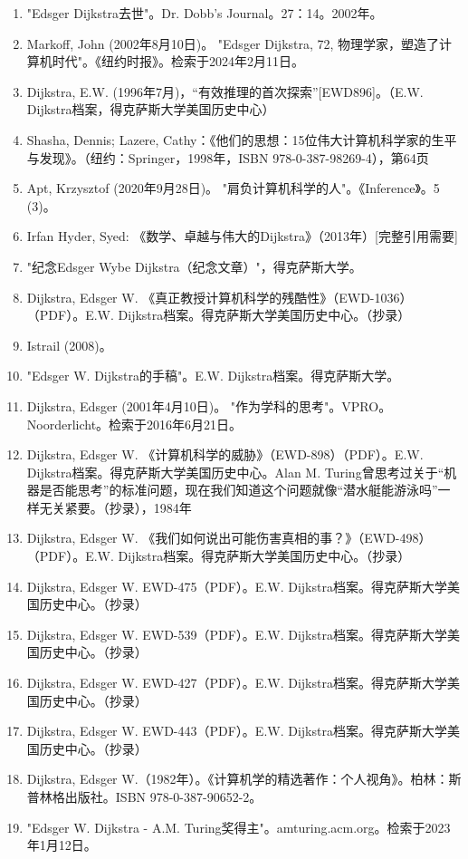 \begin{enumerate}
\item "Edsger Dijkstra去世"。Dr. Dobb's Journal。27：14。2002年。
\item Markoff, John (2002年8月10日)。 "Edsger Dijkstra, 72, 物理学家，塑造了计算机时代"。《纽约时报》。检索于2024年2月11日。
\item Dijkstra, E.W. (1996年7月)，“有效推理的首次探索”[EWD896]。（E.W. Dijkstra档案，得克萨斯大学美国历史中心）
\item Shasha, Dennis; Lazere, Cathy：《他们的思想：15位伟大计算机科学家的生平与发现》。（纽约：Springer，1998年，ISBN 978-0-387-98269-4），第64页
\item Apt, Krzysztof (2020年9月28日)。 "肩负计算机科学的人"。《Inference》。5 (3)。
\item Irfan Hyder, Syed: 《数学、卓越与伟大的Dijkstra》（2013年）[完整引用需要]
\item "纪念Edsger Wybe Dijkstra（纪念文章）"，得克萨斯大学。
\item Dijkstra, Edsger W. 《真正教授计算机科学的残酷性》（EWD-1036）（PDF）。E.W. Dijkstra档案。得克萨斯大学美国历史中心。（抄录）
\item Istrail (2008)。
\item "Edsger W. Dijkstra的手稿"。E.W. Dijkstra档案。得克萨斯大学。
\item Dijkstra, Edsger (2001年4月10日)。 "作为学科的思考"。VPRO。Noorderlicht。检索于2016年6月21日。
\item Dijkstra, Edsger W. 《计算机科学的威胁》（EWD-898）（PDF）。E.W. Dijkstra档案。得克萨斯大学美国历史中心。Alan M. Turing曾思考过关于“机器是否能思考”的标准问题，现在我们知道这个问题就像“潜水艇能游泳吗”一样无关紧要。（抄录），1984年
\item Dijkstra, Edsger W. 《我们如何说出可能伤害真相的事？》（EWD-498）（PDF）。E.W. Dijkstra档案。得克萨斯大学美国历史中心。（抄录）
\item Dijkstra, Edsger W. EWD-475（PDF）。E.W. Dijkstra档案。得克萨斯大学美国历史中心。（抄录）
\item Dijkstra, Edsger W. EWD-539（PDF）。E.W. Dijkstra档案。得克萨斯大学美国历史中心。（抄录）
\item Dijkstra, Edsger W. EWD-427（PDF）。E.W. Dijkstra档案。得克萨斯大学美国历史中心。（抄录）
\item Dijkstra, Edsger W. EWD-443（PDF）。E.W. Dijkstra档案。得克萨斯大学美国历史中心。（抄录）
\item Dijkstra, Edsger W.（1982年）。《计算机学的精选著作：个人视角》。柏林：斯普林格出版社。ISBN 978-0-387-90652-2。
\item "Edsger W. Dijkstra - A.M. Turing奖得主"。amturing.acm.org。检索于2023年1月12日。

\end{enumerate}
